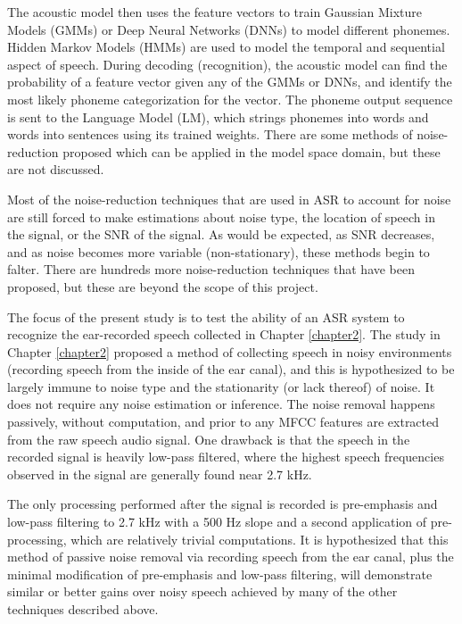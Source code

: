 The acoustic model then uses the feature vectors to train Gaussian Mixture Models (GMMs) or Deep Neural Networks (DNNs) to model different phonemes.  Hidden Markov Models (HMMs) are used to model the temporal and sequential aspect of speech. During decoding (recognition), the acoustic model can find the probability of a feature vector given any of the GMMs or DNNs, and identify the most likely phoneme categorization for the vector.  The phoneme output sequence is sent to the Language Model (LM), which strings phonemes into words and words into sentences using its trained weights.  There are some methods of noise-reduction proposed which can be applied in the model space domain, but these are not discussed.

Most of the noise-reduction techniques that are used in ASR to account for noise are still forced to make estimations about noise type, the location of speech in the signal, or the SNR of the signal.  As would be expected, as SNR decreases, and as noise becomes more variable (non-stationary), these methods begin to falter.  There are hundreds more noise-reduction techniques that have been proposed, but these are beyond the scope of this project.

The focus of the present study is to test the ability of an ASR system to recognize the ear-recorded speech collected in Chapter \ref{chapter2}.  The study in Chapter \ref{chapter2} proposed a method of collecting speech in noisy environments (recording speech from the inside of the ear canal), and this is hypothesized to be largely immune to noise type and the stationarity (or lack thereof) of noise.  It does not require any noise estimation or inference.  The noise removal happens passively, without computation, and prior to any MFCC features are extracted from the raw speech audio signal.  One drawback is that the speech in the recorded signal is heavily low-pass filtered, where the highest speech frequencies observed in the signal are generally found near 2.7 kHz.

The only processing performed after the signal is recorded is pre-emphasis and low-pass filtering to 2.7 kHz with a 500 Hz slope and a second application of pre-processing, which are relatively trivial computations.  It is hypothesized that this method of passive noise removal via recording speech from the ear canal, plus the minimal modification of pre-emphasis and low-pass filtering, will demonstrate similar or better gains over noisy speech achieved by many of the other techniques described above.


